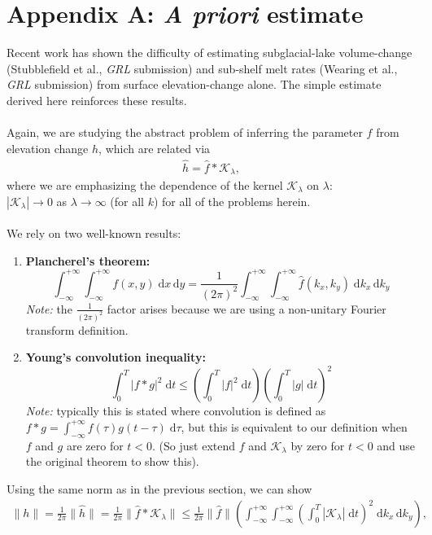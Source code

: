 \documentclass[paper=a4, fontsize=11pt]{article}
\begin{document}
\section*{Appendix A: \emph{A priori} estimate}
Recent work has shown the difficulty of estimating subglacial-lake
volume-change (Stubblefield et al., \emph{GRL} submission) and
sub-shelf melt rates (Wearing et al., \emph{GRL} submission) from
surface elevation-change alone. The simple estimate derived here reinforces these results. \\ \\
Again, we are studying the abstract problem of inferring the parameter $f$
from elevation change $h$, which are related via
\begin{align*}
\widehat{h} = \widehat{f}*\mathcal{K}_\lambda,
\end{align*}
where we are emphasizing the dependence of the kernel $\mathcal{K}_\lambda$ on $\lambda$:\\
$|\mathcal{K}_\lambda|\to 0$ as $\lambda\to \infty$ (for all $k$) for all of the problems herein.
\\ \\
We rely on two well-known results:
\begin{enumerate}
\item \textbf{Plancherel's theorem:} $$\int_{-\infty}^{+\infty}\int_{-\infty}^{+\infty} f(x,y) \;\mathrm{d}x\,\mathrm{d}y = \frac{1}{(2\pi)^2}
\int_{-\infty}^{+\infty}\int_{-\infty}^{+\infty} \widehat{f}(k_x,k_y) \;\mathrm{d}k_x\,\mathrm{d}k_y$$
{\footnotesize{\noindent \emph{Note:} the $\frac{1}{(2\pi)^2}$ factor arises because we are using a non-unitary
Fourier transform definition.}}
\item \textbf{Young's convolution inequality:}
$$\int_0^T |f*g|^2 \;\mathrm{d}t \leq \left(\int_0^T |f|^2 \;\mathrm{d}t\right)
\left(\int_0^T |g| \;\mathrm{d}t\right)^2 $$
{\footnotesize{\noindent
\emph{Note:} typically this is stated where convolution is defined as
$f*g = \int_{-\infty}^{+\infty} f(\tau)g(t-\tau)\;\mathrm{d}\tau$, but this
is equivalent to our definition when $f$ and $g$ are zero for $t<0$.
(So just extend $f$ and $\mathcal{K}_\lambda$ by zero for $t<0$ and use the
original theorem to show this).}}
\end{enumerate}
Using the same norm as in the previous section, we can show
\begin{align*}
\|h\| = \frac{1}{2\pi}\|\widehat{h}\|
= \frac{1}{2\pi}\|\widehat{f}*\mathcal{K}_\lambda \|
\leq \frac{1}{2\pi} \|\widehat{f}\| \left(\int_{-\infty}^{+\infty}\int_{-\infty}^{+\infty}\left(\int_0^T |\mathcal{K}_\lambda| \;\mathrm{d}t\right)^2 \;\mathrm{d}k_x\,\mathrm{d}k_y \right),
\end{align*}
\end{document}
